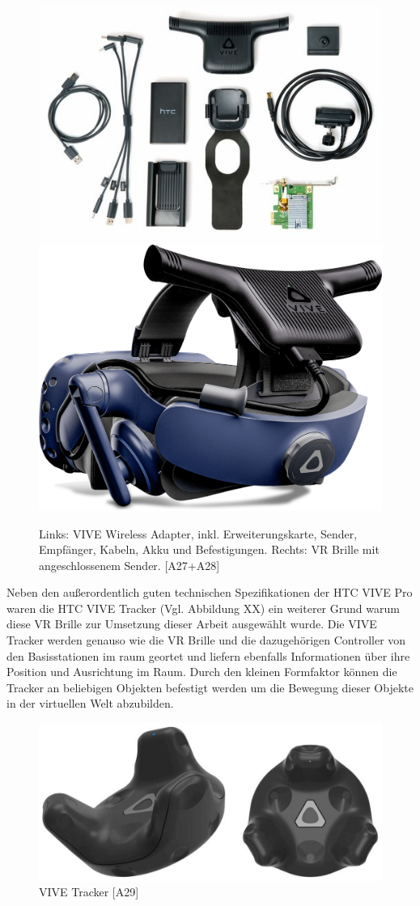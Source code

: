 \begin{figure}[h]
	\centering
	\includegraphics[width=0.5\linewidth]{Bilder/A27_WirelessKit}
	\includegraphics[width=0.4\linewidth]{Bilder/A28_Vive+Wireless}
	\caption{Links: VIVE Wireless Adapter, inkl. Erweiterungskarte, Sender, Empfänger, Kabeln, Akku und Befestigungen. Rechts: VR Brille mit angeschlossenem Sender. [A27+A28]}
	\label{fig:WirelessKit}
\end{figure}
Neben den außerordentlich guten technischen Spezifikationen der HTC VIVE Pro waren die HTC VIVE Tracker (Vgl. Abbildung XX) ein weiterer Grund warum diese VR Brille zur Umsetzung dieser Arbeit ausgewählt wurde. Die VIVE Tracker werden genauso wie die VR Brille und die dazugehörigen Controller von den Basisstationen im raum geortet und liefern ebenfalls Informationen über ihre Position und Ausrichtung im Raum. Durch den kleinen Formfaktor können die Tracker an beliebigen Objekten befestigt werden um die Bewegung dieser Objekte in der virtuellen Welt abzubilden.
\newline
\begin{figure}[h]
	\centering
	\includegraphics[width=0.7\linewidth]{Bilder/A29_ViveTracker}
	\caption{VIVE Tracker [A29]}
	\label{fig:ViveTracker}
\end{figure}
